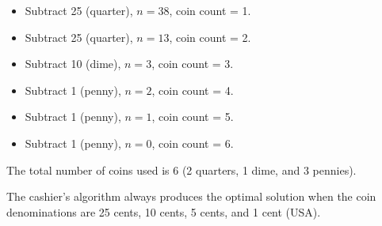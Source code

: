 \begin{eg}
\begin{itemize}[itemsep=1pt,label=$\circ$]
        \item Subtract 25 (quarter), $n = 38$, coin count = 1.
        \item Subtract 25 (quarter), $n = 13$, coin count = 2.
        \item Subtract 10 (dime), $n = 3$, coin count = 3.
        \item Subtract 1 (penny), $n = 2$, coin count = 4.
        \item Subtract 1 (penny), $n = 1$, coin count = 5.
        \item Subtract 1 (penny), $n = 0$, coin count = 6.
    \end{itemize}
    The total number of coins used is 6 (2 quarters, 1 dime, and 3 pennies).
\end{eg}

\begin{theorem}
    The cashier's algorithm always produces the optimal solution when the coin denominations are 25 cents, 10 cents, 5 cents, and 1 cent (USA).
\end{theorem}
